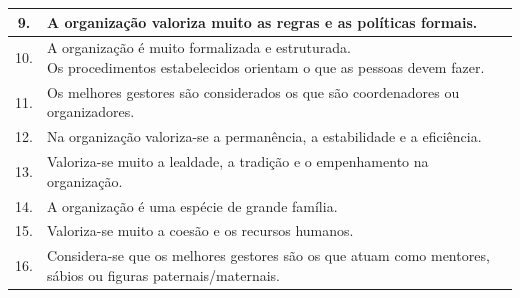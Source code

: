 \begin{frame}
\begin{table}[h!]
\begin{adjustbox}{max width=\textwidth}
\begin{tabular}{ |c|l|c| }
\hline
\cellcolor{orange} 9. & A organização valoriza muito as regras e as políticas formais. & \\
\hline
\cellcolor{orange} 10. & \makecell[l]{A organização é muito formalizada e estruturada. \\ Os procedimentos estabelecidos orientam o que as pessoas devem fazer.} & \\
\hline
\cellcolor{orange} 11. & Os melhores gestores são considerados os que são coordenadores ou organizadores. & \\
\hline
\cellcolor{orange} 12. & Na organização valoriza-se a permanência, a estabilidade e a eficiência. & \\
\hline
\cellcolor{yellow} 13. & Valoriza-se muito a lealdade, a tradição e o empenhamento na organização. & \\
\hline
\cellcolor{yellow} 14. & A organização é uma espécie de grande família. & \\
\hline
\cellcolor{yellow} 15. & Valoriza-se muito a coesão e os recursos humanos. & \\
\hline
\cellcolor{yellow} 16. & \makecell[l]{Considera-se que os melhores gestores são os que atuam como mentores, \\ sábios ou figuras paternais/maternais.} & \\
\hline
\end{tabular}
\end{adjustbox}
\end{table}
\end{frame}
